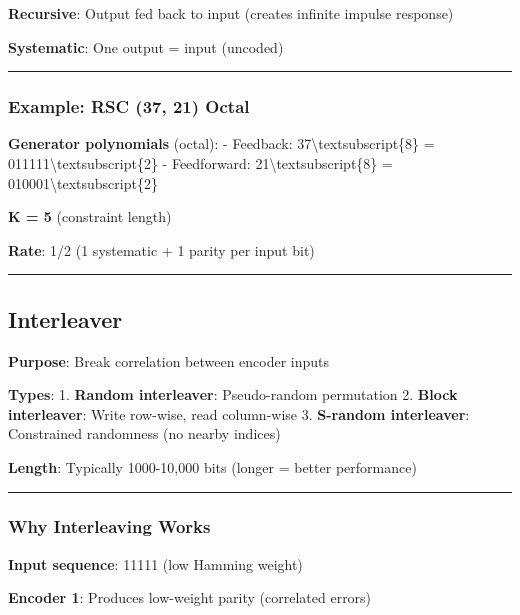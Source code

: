 \textbf{Recursive}: Output fed back to input (creates infinite impulse
response)

\textbf{Systematic}: One output = input (uncoded)

\begin{center}\rule{0.5\linewidth}{0.5pt}\end{center}

\subsubsection{Example: RSC (37, 21)
Octal}\label{example-rsc-37-21-octal}

\textbf{Generator polynomials} (octal): - Feedback:
37\textbackslash textsubscript\{8\} =
011111\textbackslash textsubscript\{2\} - Feedforward:
21\textbackslash textsubscript\{8\} =
010001\textbackslash textsubscript\{2\}

\textbf{K = 5} (constraint length)

\textbf{Rate}: 1/2 (1 systematic + 1 parity per input bit)

\begin{center}\rule{0.5\linewidth}{0.5pt}\end{center}

\subsection{Interleaver}\label{interleaver}

\textbf{Purpose}: Break correlation between encoder inputs

\textbf{Types}: 1. \textbf{Random interleaver}: Pseudo-random
permutation 2. \textbf{Block interleaver}: Write row-wise, read
column-wise 3. \textbf{S-random interleaver}: Constrained randomness (no
nearby indices)

\textbf{Length}: Typically 1000-10,000 bits (longer = better
performance)

\begin{center}\rule{0.5\linewidth}{0.5pt}\end{center}

\subsubsection{Why Interleaving Works}\label{why-interleaving-works}

\textbf{Input sequence}: 11111 (low Hamming weight)

\textbf{Encoder 1}: Produces low-weight parity (correlated errors)

